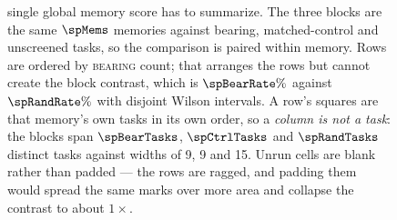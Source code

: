 \begin{figure}[t]
{single global memory score has to summarize. The three blocks are the same $\spMems$
memories against bearing, matched-control and unscreened tasks, so the
comparison is paired within memory. Rows are ordered by \textsc{bearing}
count; that arranges the rows but cannot create the block contrast, which is
$\spBearRate\%$ against $\spRandRate\%$ with disjoint Wilson intervals. A row's squares are that memory's own tasks in its
own order, so a \emph{column is not a task}: the blocks span $\spBearTasks$,
$\spCtrlTasks$ and $\spRandTasks$ distinct tasks against widths of 9, 9 and
15. Unrun cells are blank rather than padded --- the rows are ragged, and
padding them would spread the same marks over more area and collapse the
contrast to about $1\times$.}
\label{fig:sparsitymap}
\end{figure}
